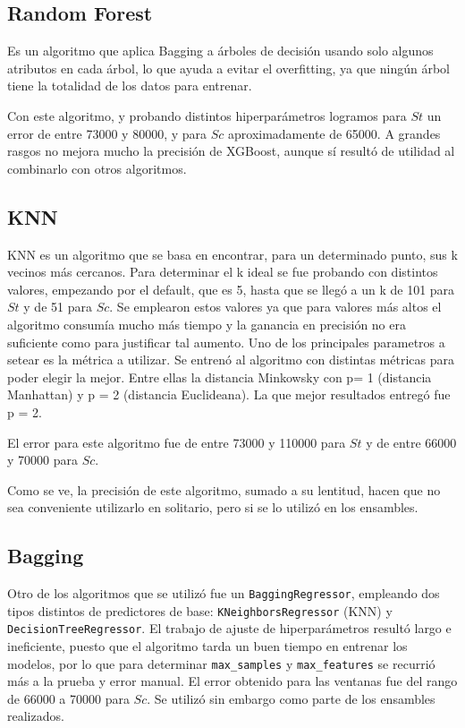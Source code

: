 \documentclass[a4paper, 12pt]{article}
\begin{document}
\subsection{Random Forest}
Es un algoritmo que aplica Bagging a árboles de decisión usando solo algunos atributos en cada árbol, lo que ayuda a evitar el overfitting, ya que ningún árbol tiene la totalidad de los datos para entrenar.

Con este algoritmo, y probando distintos hiperparámetros logramos para $St$ un error de entre 73000 y 80000, y para $Sc$ aproximadamente de 65000. A grandes rasgos no mejora mucho la precisión de XGBoost, aunque sí resultó de utilidad al combinarlo con otros algoritmos.

\subsection{KNN}
KNN es un algoritmo que se basa en encontrar, para un determinado punto, sus k vecinos más cercanos. Para determinar el k ideal se fue probando con distintos valores, empezando por el default, que es 5, hasta que se llegó a un k de 101 para $St$ y de 51 para $Sc$. Se emplearon estos valores ya que para valores más altos el algoritmo consumía mucho más tiempo y la ganancia en precisión no era suficiente como para justificar tal aumento.
Uno de los principales parametros a setear es la métrica a utilizar. Se entrenó al algoritmo con distintas métricas para poder elegir la mejor. Entre ellas la distancia Minkowsky con p= 1 (distancia Manhattan) y p = 2 (distancia Euclideana). La que mejor resultados entregó fue p = 2.

El error para este algoritmo fue de entre 73000 y 110000 para $St$ y de entre 66000 y 70000 para $Sc$.

Como se ve, la precisión de este algoritmo, sumado a su lentitud, hacen que no sea conveniente utilizarlo en solitario, pero si se lo utilizó en los ensambles.

\subsection{Bagging}
Otro de los algoritmos que se utilizó fue un \texttt{BaggingRegressor}, empleando dos tipos distintos de predictores de base: \texttt{KNeighborsRegressor} (KNN) y \texttt{DecisionTreeRegressor}. El trabajo de ajuste de hiperparámetros resultó largo e ineficiente, puesto que el algoritmo tarda un buen tiempo en entrenar los modelos, por lo que para determinar \texttt{max\_}\texttt{samples} y \texttt{max\_}\texttt{features} se recurrió más a la prueba y error manual. El error obtenido para las ventanas fue del rango de 66000 a 70000 para $Sc$. Se utilizó sin embargo como parte de los ensambles realizados.
\end{document}
